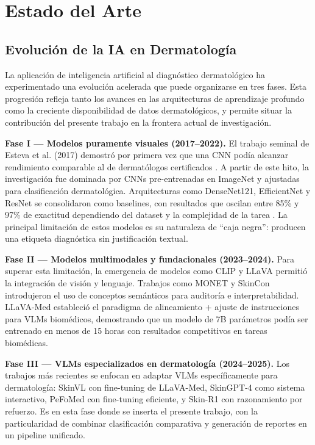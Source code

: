 \documentclass[11pt, a4paper]{article}
\begin{document}
\section{Estado del Arte}

\subsection{Evolución de la IA en Dermatología}

La aplicación de inteligencia artificial al diagnóstico dermatológico ha experimentado una evolución acelerada que puede organizarse en tres fases. Esta progresión refleja tanto los avances en las arquitecturas de aprendizaje profundo como la creciente disponibilidad de datos dermatológicos, y permite situar la contribución del presente trabajo en la frontera actual de investigación.

\textbf{Fase I — Modelos puramente visuales (2017--2022).} El trabajo seminal de Esteva et al. (2017) demostró por primera vez que una CNN podía alcanzar rendimiento comparable al de dermatólogos certificados \cite{esteva_dermatologist_2017}. A partir de este hito, la investigación fue dominada por CNNs pre-entrenadas en ImageNet y ajustadas para clasificación dermatológica. Arquitecturas como DenseNet121, EfficientNet y ResNet se consolidaron como baselines, con resultados que oscilan entre 85\% y 97\% de exactitud dependiendo del dataset y la complejidad de la tarea \cite{khan_ensemble_2025, aboulmira_skinhealthmate_2024}. La principal limitación de estos modelos es su naturaleza de ``caja negra'': producen una etiqueta diagnóstica sin justificación textual.

\textbf{Fase II — Modelos multimodales y fundacionales (2023--2024).} Para superar esta limitación, la emergencia de modelos como CLIP y LLaVA permitió la integración de visión y lenguaje. Trabajos como MONET \cite{kim_monet_2024} y SkinCon \cite{daneshjou_skincon_2022} introdujeron el uso de conceptos semánticos para auditoría e interpretabilidad. LLaVA-Med \cite{li_llava-med_2023} estableció el paradigma de alineamiento + ajuste de instrucciones para VLMs biomédicos, demostrando que un modelo de 7B parámetros podía ser entrenado en menos de 15 horas con resultados competitivos en tareas biomédicas.

\textbf{Fase III — VLMs especializados en dermatología (2024--2025).} Los trabajos más recientes se enfocan en adaptar VLMs específicamente para dermatología: SkinVL \cite{zhao_mm-skin_2025} con fine-tuning de LLaVA-Med, SkinGPT-4 \cite{zhou_skingpt4_2024} como sistema interactivo, PeFoMed \cite{he_pefomed_2024} con fine-tuning eficiente, y Skin-R1 \cite{kang_skinr1_2025} con razonamiento por refuerzo. Es en esta fase donde se inserta el presente trabajo, con la particularidad de combinar clasificación comparativa y generación de reportes en un pipeline unificado.
\end{document}
